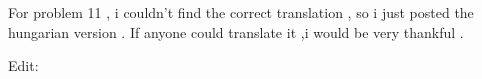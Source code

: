 For problem 11 , i couldn’t find the correct translation , so i just posted the hungarian version . If anyone could translate it ,i would be very thankful .




Edit:

